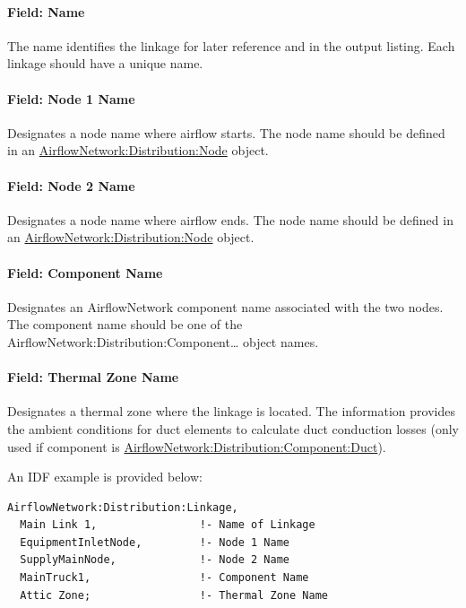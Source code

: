 \paragraph{Field: Name}\label{field-name-19}

The name identifies the linkage for later reference and in the output listing. Each linkage should have a unique name.

\paragraph{Field: Node 1 Name}\label{field-node-1-name-1}

Designates a node name where airflow starts. The node name should be defined in an \hyperref[airflownetworkdistributionnode]{AirflowNetwork:Distribution:Node} object.

\paragraph{Field: Node 2 Name}\label{field-node-2-name-1}

Designates a node name where airflow ends. The node name should be defined in an \hyperref[airflownetworkdistributionnode]{AirflowNetwork:Distribution:Node} object.

\paragraph{Field: Component Name}\label{field-component-name-1-000}

Designates an AirflowNetwork component name associated with the two nodes. The component name should be one of the AirflowNetwork:Distribution:Component\ldots{} object names.

\paragraph{Field: Thermal Zone Name}\label{field-thermal-zone-name}

Designates a thermal zone where the linkage is located. The information provides the ambient conditions for duct elements to calculate duct conduction losses (only used if component is \hyperref[airflownetworkdistributioncomponentduct]{AirflowNetwork:Distribution:Component:Duct}).

An IDF example is provided below:

\begin{lstlisting}
AirflowNetwork:Distribution:Linkage,
  Main Link 1,                !- Name of Linkage
  EquipmentInletNode,         !- Node 1 Name
  SupplyMainNode,             !- Node 2 Name
  MainTruck1,                 !- Component Name
  Attic Zone;                 !- Thermal Zone Name
\end{lstlisting}

